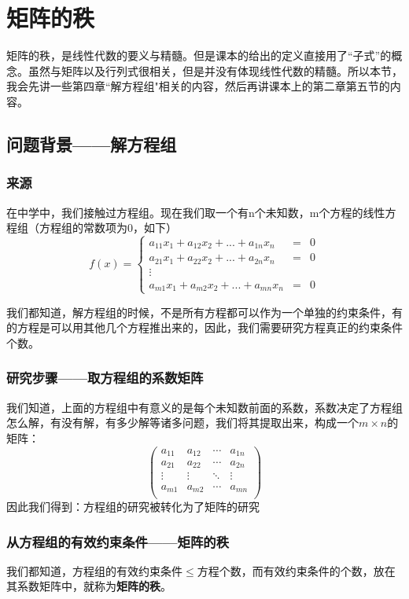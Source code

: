 \chapter{矩阵的秩}

矩阵的秩，是线性代数的要义与精髓。但是课本的给出的定义直接用了“子式”的概念。虽然与矩阵以及行列式很相关，但是并没有体现线性代数的精髓。所以本节，我会先讲一些第四章“解方程组"相关的内容，然后再讲课本上的第二章第五节的内容。

\section{问题背景——解方程组}
\subsection{来源}
在中学中，我们接触过方程组。现在我们取一个有n个未知数，m个方程的线性方程组（方程组的常数项为0，如下）
$$ f(x)=\left\{
	\begin{aligned}
		a_{11}x_1+a_{12}x_2+...+a_{1n}x_n & = & 0 \\
		a_{21}x_1+a_{22}x_2+...+a_{2n}x_n & = & 0 \\
		\vdots                                    \\
		a_{m1}x_1+a_{m2}x_2+...+a_{mn}x_n & = & 0
	\end{aligned}
	\right.
$$

我们都知道，解方程组的时候，不是所有方程都可以作为一个单独的约束条件，有的方程是可以用其他几个方程推出来的，因此，我们需要研究方程真正的约束条件个数。
\subsection{研究步骤——取方程组的系数矩阵}
我们知道，上面的方程组中有意义的是每个未知数前面的系数，系数决定了方程组怎么解，有没有解，有多少解等诸多问题，我们将其提取出来，构成一个$m\times n$的矩阵：
$$
	\left (
	\begin{matrix}
			a_{11} & a_{12} & \cdots & a_{1n} \\
			a_{21} & a_{22} & \cdots & a_{2n} \\
			\vdots & \vdots & \ddots & \vdots \\
			a_{m1} & a_{m2} & \cdots & a_{mn} \\
		\end{matrix}
	\right  )
$$
因此我们得到：方程组的研究被转化为了矩阵的研究
\subsection{从方程组的有效约束条件——矩阵的秩}
我们都知道，方程组的有效约束条件$\leq$方程个数，而有效约束条件的个数，放在其系数矩阵中，就称为\textbf{矩阵的秩}。
